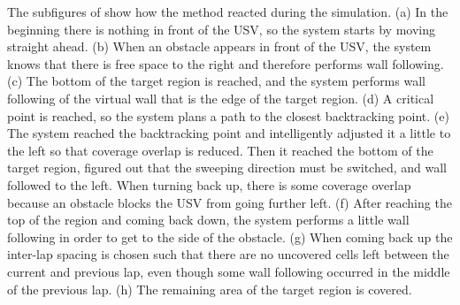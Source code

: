 The subfigures of  show how the method reacted during the simulation. (a) In the beginning there is nothing in front of the USV, so the system starts by moving straight ahead. (b) When an obstacle appears in front of the USV, the system knows that there is free space to the right and therefore performs wall following. (c) The bottom of the target region is reached, and the system performs wall following of the virtual wall that is the edge of the target region. (d) A critical point is reached, so the system plans a path to the closest backtracking point. (e) The system reached the backtracking point and intelligently adjusted it a little to the left so that coverage overlap is reduced. Then it reached the bottom of the target region, figured out that the sweeping direction must be switched, and wall followed to the left. When turning back up, there is some coverage overlap because an obstacle blocks the USV from going further left. (f) After reaching the top of the region and coming back down, the system performs a little wall following in order to get to the side of the obstacle. (g) When coming back up the inter-lap spacing is chosen such that there are no uncovered cells left between the current and previous lap, even though some wall following occurred in the middle of the previous lap. (h) The remaining area of the target region is covered. 



